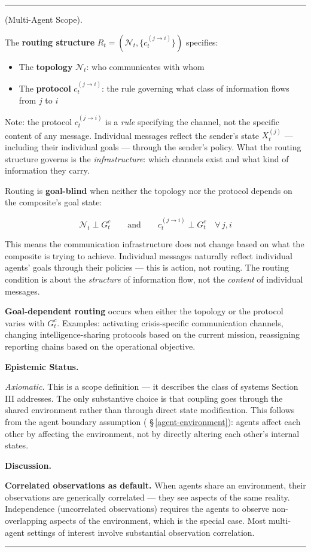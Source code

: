 \documentclass[11pt,oneside]{article}
\newcounter{claim}[section]
\renewcommand{\theclaim}{\thesection.\arabic{claim}}
\newenvironment{segment}[2]{%
  \refstepcounter{claim}%
  \bigskip\noindent\hrule\smallskip
  \noindent{\bfseries #1~\theclaim}\enskip(#2).\par\smallskip
  \noindent\ignorespaces
}{%
  \par\smallskip\noindent\hrule\bigskip
}
\newenvironment{scope}[1][]{\begin{segment}{Scope}{#1}}{\end{segment}}
\begin{document}
\begin{scope}[Multi-Agent Scope]
The \textbf{routing structure} $R_t = (\mathcal N_t, \{c_t^{(j \to i)}\})$ specifies:
\begin{itemize}
  \item The \textbf{topology} $\mathcal N_t$: who communicates with whom
  \item The \textbf{protocol} $c_t^{(j \to i)}$: the rule governing what class of information flows from $j$ to $i$
\end{itemize}


Note: the protocol $c_t^{(j \to i)}$ is a \textit{rule} specifying the channel, not the specific content of any message. Individual messages reflect the sender's state $X_t^{(j)}$ — including their individual goals — through the sender's policy. What the routing structure governs is the \textit{infrastructure}: which channels exist and what kind of information they carry.


Routing is \textbf{goal-blind} when neither the topology nor the protocol depends on the composite's goal state:

$$\mathcal N_t \perp G_t^c \qquad \text{and} \qquad c_t^{(j \to i)} \perp G_t^c \quad \forall\, j, i$$

This means the communication infrastructure does not change based on what the composite is trying to achieve. Individual messages naturally reflect individual agents' goals through their policies — this is action, not routing. The routing condition is about the \textit{structure} of information flow, not the \textit{content} of individual messages.

\textbf{Goal-dependent routing} occurs when either the topology or the protocol varies with $G_t^c$. Examples: activating crisis-specific communication channels, changing intelligence-sharing protocols based on the current mission, reassigning reporting chains based on the operational objective.


\medskip\noindent\textbf{Epistemic Status.}


\textit{Axiomatic.} This is a scope definition — it describes the class of systems Section III addresses. The only substantive choice is that coupling goes through the shared environment rather than through direct state modification. This follows from the agent boundary assumption ( \S\,\ref{agent-environment}): agents affect each other by affecting the environment, not by directly altering each other's internal states.


\medskip\noindent\textbf{Discussion.}


\textbf{Correlated observations as default.} When agents share an environment, their observations are generically correlated — they see aspects of the same reality. Independence (uncorrelated observations) requires the agents to observe non-overlapping aspects of the environment, which is the special case. Most multi-agent settings of interest involve substantial observation correlation.


\end{scope}
\end{document}
